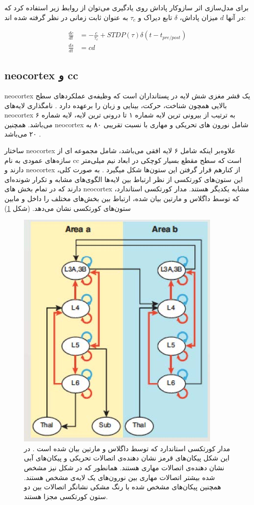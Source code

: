 \documentclass[12pt]{report}
\begin{document}
	برای مدل‌سازی اثر سازوکار پاداش روی یادگیری می‌توان از روابط زیر استفاده کرد که در آنها $d$ میزان پاداش، $\delta$ تابع دیراک و $\tau_c$ به عنوان ثابت زمانی در نظر گرفته شده اند:
	
	\begin{align}
		\frac{dc}{dt} &= -\frac{c}{\tau_c} + STDP(\tau) \delta(t-t_{pre/post}) \\
		\frac{ds}{dt} &= cd
		\label{eq:rstdp}
	\end{align}
	
	
	\subsection{\gls{neocortex} و \gls{cc}}
	\gls{neocortex} یک قشر مغزی شش لایه در پستانداران است که وظیفه‌ی عملکرد‌های سطح بالایی همچون شناخت، حرکت، بینایی و زبان را برعهده دارد
	\cite{Lui2011}. نامگذاری لایه‌های \gls{neocortex} به ترتیب از بیرونی ترین لایه شماره ۱ تا درونی ترین لایه، لایه شماره ۶ می‌باشد.
	همچنین \gls{neocortex} شامل نورون های تحریکی و مهاری با نسبت تقریبی ۸۰ به ۲۰ می‌باشد
	\cite{noback2005human}.
	
	ساختار \gls{neocortex} علاوه‌بر اینکه شامل ۶ لایه افقی می‌باشد، شامل مجموعه ای از سازه‌های عمودی به نام \gls{cc} است که سطح مقطع بسیار کوچکی در ابعاد نیم میلی‌متر دارند و \gls{neocortex} از کنار‌هم قرار گرفتن این ستون‌ها شکل میگیرد
	\cite{Horton2005}.
	به صورت کلی، این ستون‌های کورتکسی از نظر ارتباط بین لایه‌ها الگوی‌های مشابه و تکرار شونده‌ای دارند که در تمام بخش های \gls{neocortex} مشابه یکدیگر هستند. مدار کورتکسی استاندارد، که توسط داگلاس و مارتین 
	\cite{Douglas2004}
	بیان شده، ارتباط بین بخش‌های مختلف را داخل و مابین ستون‌های کورتکسی نشان می‌دهد.
	(شکل \ref{fig:cc-doganmart})
	
	\begin{figure}[H]
		\centering
		\includegraphics[width=0.5\linewidth]{cc-con.jpg}
		\caption[NS]{
			مدار کورتکسی استاندارد که توسط داگلاس و مارتین بیان شده است
			\cite{Douglas2004}.
			در این شکل پیکان‌های قرمز نشان دهنده‌ی اتصالات تحریکی و پیکان‌های آبی نشان دهنده‌ی اتصالات مهاری هستند. همانطور که در شکل نیز مشخص شده بیشتر اتصالات مهاری بین نورون‌های یک لایه‌ی مشخص هستند. همچنین پیکان‌های مشخص شده با رنگ مشکی نشانگر اتصالات بین دو ستون کورتکسی مجزا هستند.
		}
		\label{fig:cc-doganmart}
	\end{figure}
	
\end{document}
